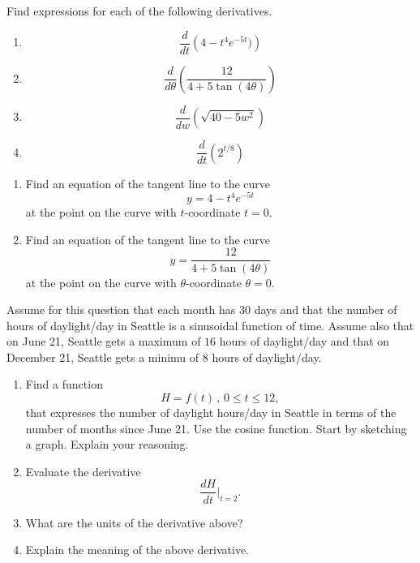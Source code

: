 \documentclass{ximera}
\begin{document}
\begin{question}  \label{Qujn5tyh6uu}
Find expressions for each of the following derivatives.

\begin{enumerate}
\item 
\[
\frac{d}{dt}\left( 4 - t^4 e^{-5t})  \right)
\]

\item 
\[
\frac{d}{d\theta}\left(  \frac{12}{4 + 5\tan (4\theta)}   \right)
\]

\item
\[
   \frac{d}{dw}\left(   \sqrt{40-5w^2}   \right)
\]

\item
\[
   \frac{d}{dt}\left(   2^{t/8}   \right)
\]

\end{enumerate}

\end{question}

\begin{question}
\begin{enumerate}

\item Find an equation of the tangent line to the curve 
\[
  y =  4 - t^4 e^{-5t}
\]
at the point on the curve with $t$-coordinate $t=0$.

\item Find an equation of the tangent line to the curve 
\[
  y =   \frac{12}{4 + 5\tan (4\theta)}
\]
at the point on the curve with $\theta$-coordinate $\theta=0$.
\end{enumerate}
\end{question}

\begin{question} \label{Q000d9ggdgbgh}
Assume for this question that each month has 30 days and that the number of hours of daylight/day in Seattle is a sinusoidal function of time. Assume also that on June 21, Seattle gets a maximum of $16$ hours of daylight/day and that on December 21, Seattle gets a minimu of $8$ hours of daylight/day.

\begin{enumerate}
\item Find a function 
\[
   H = f(t) \, , \, 0\leq t\leq 12,
\]
that expresses the number of daylight hours/day in Seattle in terms of the number of months since June 21. Use the cosine function. Start by sketching a graph. Explain your reasoning.

\item Evaluate the derivative 
\[
   \frac{dH}{dt}\Big|_{t=2} .
\]

\item What are the units of the derivative above?

\item Explain the meaning of the above derivative.
\end{enumerate}

\end{question}
\end{document}
